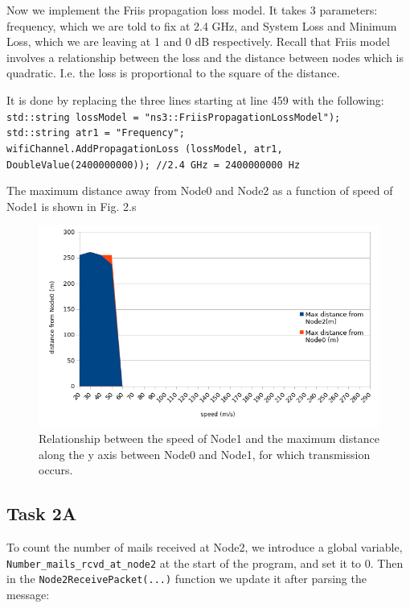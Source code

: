 \documentclass[11pt,journal]{article}
\begin{document}
	Now we implement the Friis propagation loss model. It takes 3 parameters: frequency, which we are told to fix at 2.4 GHz, and System Loss and Minimum Loss, which we are leaving at 1 and 0 dB respectively. Recall that Friis model involves a relationship between the loss and the distance between nodes which is quadratic. I.e. the loss is proportional to the square of the distance. 
	
	It is done by replacing the three lines starting at line 459 with the following:\\	
	\texttt{std::string lossModel = "ns3::FriisPropagationLossModel");}\\
	\texttt{std::string atr1 = "Frequency";}\\
	\texttt{wifiChannel.AddPropagationLoss (lossModel, atr1, DoubleValue(2400000000)); //2.4 GHz = 2400000000 Hz}
	
	The maximum distance away from Node0 and Node2 as a function of speed of Node1 is shown in Fig. 2.s
	
	\begin{figure}[h]
		\centering
		\includegraphics[scale=0.7]{graph1b.png}
		\caption{Relationship between the speed of Node1 and the maximum distance along the y axis between Node0 and Node1, for which transmission occurs.}
	\end{figure}
	
	\subsection{Task 2A}
	
	To count the number of mails received at Node2, we introduce a global variable, \texttt{Number\_mails\_rcvd\_at\_node2} at the start of the program, and set it to 0. Then in the \texttt{Node2ReceivePacket(...)} function we update it after parsing the message:
	
\end{document}
